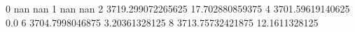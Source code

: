 0 nan nan
1 nan nan
2 3719.299072265625 17.702880859375
4 3701.59619140625 0.0
6 3704.7998046875 3.20361328125
8 3713.75732421875 12.1611328125
